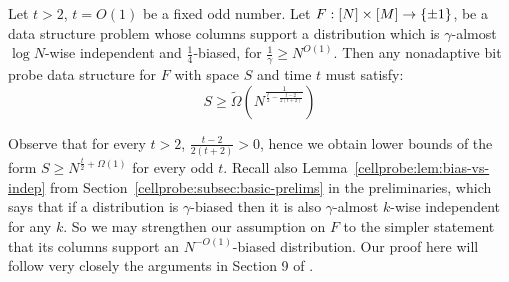 \begin{theorem*} 
Let $t>2$, $t = O(1)$ be a fixed odd number.  Let $F:[N] \times [M] \to \{\pm 1\}$, be a data structure problem whose columns support a distribution which is $\gamma$-almost $\log N$-wise independent and $\frac{1}{4}$-biased, for $\frac{1}{\gamma} \geq N^{O(1)}$. Then any nonadaptive bit probe data structure for $F$ with space $S$ and time $t$ must satisfy:
\[
S \geq \tilde{\Omega}(N^{\frac{1}{\frac{t}{2} -\frac{t- 2}{2(t+2)}}})
\]
\end{theorem*}
Observe that for every $t>2$, $\frac{t-2}{2(t+2)} > 0$, hence we obtain lower bounds of the form $S \geq N^{\frac{t}{2} + \Omega(1)}$ for every odd $t$. Recall also Lemma~\ref{cellprobe:lem:bias-vs-indep} from Section~\ref{cellprobe:subsec:basic-prelims} in the preliminaries, which says that if a distribution is $\gamma$-biased then it is also $\gamma$-almost $k$-wise independent for any $k$. So we may strengthen our assumption on $F$ to the simpler statement that its columns support an $N^{-O(1)}$-biased distribution. Our proof here will follow very closely the arguments in Section 9 of \cite{smoothed}.
